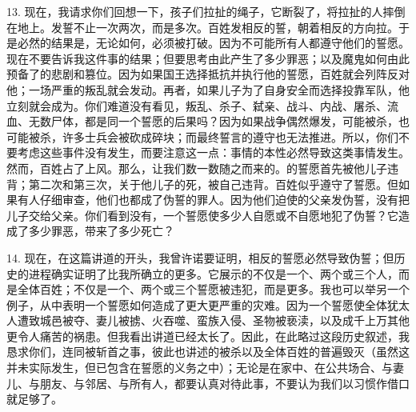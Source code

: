 13. 现在，我请求你们回想一下，孩子们拉扯的绳子，它断裂了，将拉扯的人摔倒在地上。发誓不止一次两次，而是多次。百姓发相反的誓，朝着相反的方向拉。于是必然的结果是，无论如何，必须被打破。因为不可能所有人都遵守他们的誓愿。现在不要告诉我这件事的结果；但要思考由此产生了多少罪恶；以及魔鬼如何由此预备了的悲剧和篡位。因为如果国王选择抵抗并执行他的誓愿，百姓就会列阵反对他；一场严重的叛乱就会发动。再者，如果儿子为了自身安全而选择投靠军队，他立刻就会成为。你们难道没有看见，叛乱、杀子、弑亲、战斗、内战、屠杀、流血、无数尸体，都是同一个誓愿的后果吗？因为如果战争偶然爆发，可能被杀，也可能被杀，许多士兵会被砍成碎块；而最终誓言的遵守也无法推进。所以，你们不要考虑这些事件没有发生，而要注意这一点：事情的本性必然导致这类事情发生。然而，百姓占了上风。那么，让我们数一数随之而来的。的誓愿首先被他儿子违背；第二次和第三次，关于他儿子的死，被自己违背。百姓似乎遵守了誓愿。但如果有人仔细审查，他们也都成了伪誓的罪人。因为他们迫使的父亲发伪誓，没有把儿子交给父亲。你们看到没有，一个誓愿使多少人自愿或不自愿地犯了伪誓？它造成了多少罪恶，带来了多少死亡？\par

14. 现在，在这篇讲道的开头，我曾许诺要证明，相反的誓愿必然导致伪誓；但历史的进程确实证明了比我所确立的更多。它展示的不仅是一个、两个或三个人，而是全体百姓；不仅是一个、两个或三个誓愿被违犯，而是更多。我也可以举另一个例子，从中表明一个誓愿如何造成了更大更严重的灾难。因为一个誓愿使全体犹太人遭致城邑被夺、妻儿被掳、火吞噬、蛮族入侵、圣物被亵渎，以及成千上万其他更令人痛苦的祸患。但我看出讲道已经太长了。因此，在此略过这段历史叙述，我恳求你们，连同被斩首之事，彼此也讲述的被杀以及全体百姓的普遍毁灭（虽然这并未实际发生，但已包含在誓愿的义务之中）；无论是在家中、在公共场合、与妻儿、与朋友、与邻居、与所有人，都要认真对待此事，不要认为我们以习惯作借口就足够了。\par

